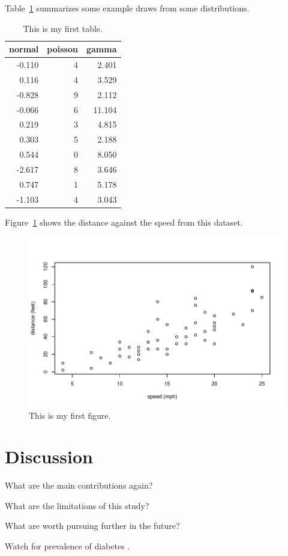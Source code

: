 \documentclass[12pt]{article}
\begin{document}
Table~\ref{tab:rv} summarizes some example draws from some distributions.
\lipsum[1-4]

\begin{table}[tbp]
  \caption{This is my first table.}
  \label{tab:rv}
\centering
\begin{tabular}{rrr}
  \toprule
normal & poisson & gamma \\ 
  \midrule
-0.110 & 4 & 2.401 \\ 
  0.116 & 4 & 3.529 \\ 
  -0.828 & 9 & 2.112 \\ 
  -0.066 & 6 & 11.104 \\ 
  0.219 & 3 & 4.815 \\ 
  0.303 & 5 & 2.188 \\ 
  0.544 & 0 & 8.050 \\ 
  -2.617 & 8 & 3.646 \\ 
  0.747 & 1 & 5.178 \\ 
  -1.103 & 4 & 3.043 \\ 
   \bottomrule
\end{tabular}
\end{table}

Figure~\ref{fig:cars} shows the distance against the speed from this dataset.


\begin{figure}[tbp]
  \centering
  \includegraphics[width=\textwidth]{cars.pdf}
  \caption{This is my first figure.}
  \label{fig:cars}
\end{figure}

\section{Discussion}
\label{sec:disc}

What are the main contributions again?

What are the limitations of this study?

What are worth pursuing further in the future?

\lipsum[1-2]
Watch for prevalence of diabetes \citep{wild2004global}.



\end{document}
